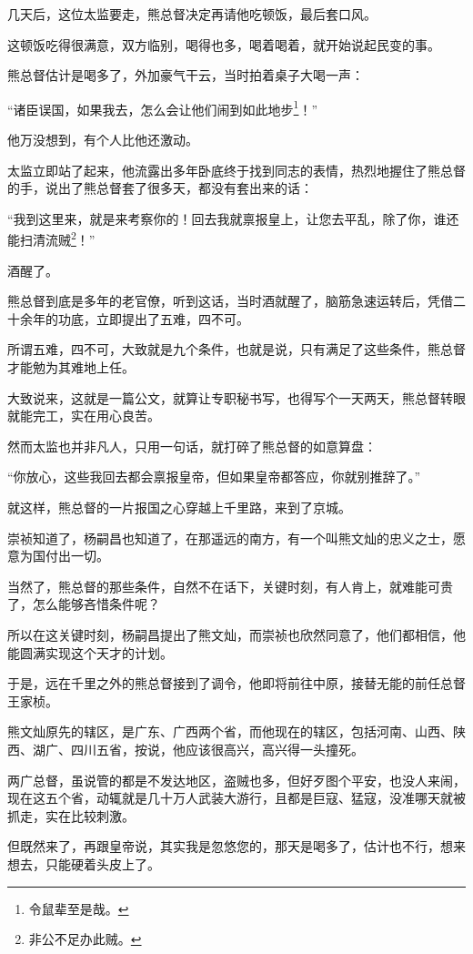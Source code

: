 \begin{multicols}{\theparacolNo}
		几天后，这位太监要走，熊总督决定再请他吃顿饭，最后套口风。

		这顿饭吃得很满意，双方临别，喝得也多，喝着喝着，就开始说起民变的事。

		熊总督估计是喝多了，外加豪气干云，当时拍着桌子大喝一声：

		“诸臣误国，如果我去，怎么会让他们闹到如此地步\footnote{令鼠辈至是哉。}！”

		他万没想到，有个人比他还激动。

		太监立即站了起来，他流露出多年卧底终于找到同志的表情，热烈地握住了熊总督的手，说出了熊总督套了很多天，都没有套出来的话：

		“我到这里来，就是来考察你的！回去我就禀报皇上，让您去平乱，除了你，谁还能扫清流贼\footnote{非公不足办此贼。}！”

		酒醒了。

		熊总督到底是多年的老官僚，听到这话，当时酒就醒了，脑筋急速运转后，凭借二十余年的功底，立即提出了五难，四不可。

		所谓五难，四不可，大致就是九个条件，也就是说，只有满足了这些条件，熊总督才能勉为其难地上任。

		大致说来，这就是一篇公文，就算让专职秘书写，也得写个一天两天，熊总督转眼就能完工，实在用心良苦。

		然而太监也并非凡人，只用一句话，就打碎了熊总督的如意算盘：

		“你放心，这些我回去都会禀报皇帝，但如果皇帝都答应，你就别推辞了。”

		就这样，熊总督的一片报国之心穿越上千里路，来到了京城。

		崇祯知道了，杨嗣昌也知道了，在那遥远的南方，有一个叫熊文灿的忠义之士，愿意为国付出一切。

		当然了，熊总督的那些条件，自然不在话下，关键时刻，有人肯上，就难能可贵了，怎么能够吝惜条件呢？

		所以在这关键时刻，杨嗣昌提出了熊文灿，而崇祯也欣然同意了，他们都相信，他能圆满实现这个天才的计划。

		于是，远在千里之外的熊总督接到了调令，他即将前往中原，接替无能的前任总督王家桢。

		熊文灿原先的辖区，是广东、广西两个省，而他现在的辖区，包括河南、山西、陕西、湖广、四川五省，按说，他应该很高兴，高兴得一头撞死。

		两广总督，虽说管的都是不发达地区，盗贼也多，但好歹图个平安，也没人来闹，现在这五个省，动辄就是几十万人武装大游行，且都是巨寇、猛寇，没准哪天就被抓走，实在比较刺激。

		但既然来了，再跟皇帝说，其实我是忽悠您的，那天是喝多了，估计也不行，想来想去，只能硬着头皮上了。


\end{multicols}
